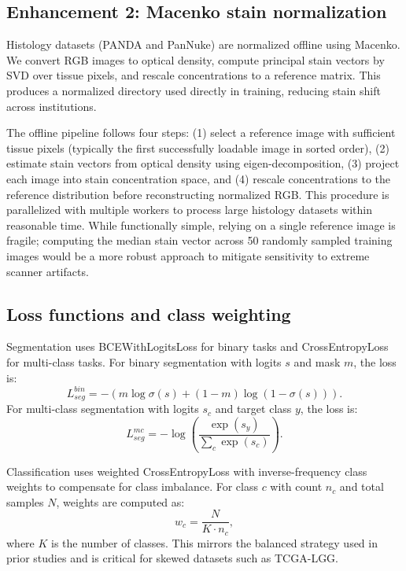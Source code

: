 \documentclass[conference,a4paper]{IEEEtran}
\begin{document}
\subsection{Enhancement 2: Macenko stain normalization}
Histology datasets (PANDA and PanNuke) are normalized offline using Macenko. We convert RGB images to optical density, compute principal stain vectors by SVD over tissue pixels, and rescale concentrations to a reference matrix. This produces a normalized directory used directly in training, reducing stain shift across institutions.

The offline pipeline follows four steps: (1) select a reference image with sufficient tissue pixels (typically the first successfully loadable image in sorted order), (2) estimate stain vectors from optical density using eigen-decomposition, (3) project each image into stain concentration space, and (4) rescale concentrations to the reference distribution before reconstructing normalized RGB. This procedure is parallelized with multiple workers to process large histology datasets within reasonable time. While functionally simple, relying on a single reference image is fragile; computing the median stain vector across 50 randomly sampled training images would be a more robust approach to mitigate sensitivity to extreme scanner artifacts.

\subsection{Loss functions and class weighting}
Segmentation uses BCEWithLogitsLoss for binary tasks and CrossEntropyLoss for multi-class tasks. For binary segmentation with logits $s$ and mask $m$, the loss is:
\begin{equation}
L_{seg}^{bin} = - \left(m \log \sigma(s) + (1 - m) \log (1 - \sigma(s))\right).
\end{equation}
For multi-class segmentation with logits $s_c$ and target class $y$, the loss is:
\begin{equation}
L_{seg}^{mc} = -\log\left(\frac{\exp(s_y)}{\sum_c \exp(s_c)}\right).
\end{equation}

Classification uses weighted CrossEntropyLoss with inverse-frequency class weights to compensate for class imbalance. For class $c$ with count $n_c$ and total samples $N$, weights are computed as:
\begin{equation}
w_c = \frac{N}{K \cdot n_c},
\end{equation}
where $K$ is the number of classes. This mirrors the balanced strategy used in prior studies and is critical for skewed datasets such as TCGA-LGG.
\end{document}
